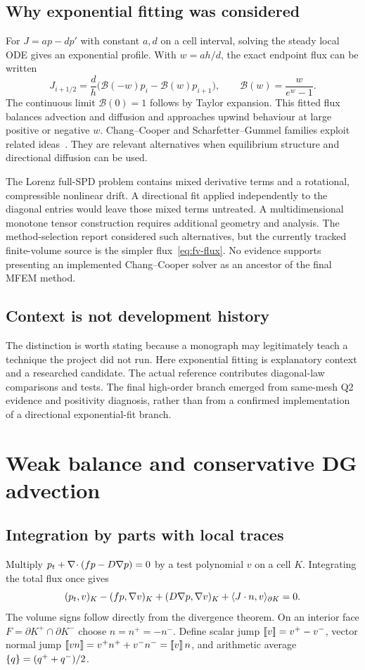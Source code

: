 \section{Why exponential fitting was considered}
For $J=ap-dp'$ with constant $a,d$ on a cell interval, solving the steady local ODE gives an exponential profile. With $w=ah/d$, the exact endpoint flux can be written
\begin{equation}\label{eq:sg}
J_{i+1/2}=\frac d h\big(\mathcal B(-w)p_i-\mathcal B(w)p_{i+1}\big),\qquad
\mathcal B(w)=\frac{w}{e^w-1}.
\end{equation}
The continuous limit $\mathcal B(0)=1$ follows by Taylor expansion. This fitted flux balances advection and diffusion and approaches upwind behaviour at large positive or negative $w$. Chang--Cooper and Scharfetter--Gummel families exploit related ideas~\cite{chang}. They are relevant alternatives when equilibrium structure and directional diffusion can be used.

The Lorenz full-SPD problem contains mixed derivative terms and a rotational, compressible nonlinear drift. A directional fit applied independently to the diagonal entries would leave those mixed terms untreated. A multidimensional monotone tensor construction requires additional geometry and analysis. The method-selection report considered such alternatives, but the currently tracked finite-volume source is the simpler flux~\eqref{eq:fv-flux}. No evidence supports presenting an implemented Chang--Cooper solver as an ancestor of the final MFEM method.

\section{Context is not development history}
The distinction is worth stating because a monograph may legitimately teach a technique the project did not run. Here exponential fitting is explanatory context and a researched candidate. The actual reference contributes diagonal-law comparisons and tests. The final high-order branch emerged from same-mesh Q2 evidence and positivity diagnosis, rather than from a confirmed implementation of a directional exponential-fit branch.

\chapter{Weak balance and conservative DG advection}\label{ch:weak}
\section{Integration by parts with local traces}
Multiply $p_t+\nabla\!\cdot(fp-D\nabla p)=0$ by a test polynomial $v$ on a cell $K$. Integrating the total flux once gives
\begin{equation}\label{eq:cell-weak}
(p_t,v)_K-(fp,\nabla v)_K+(D\nabla p,\nabla v)_K
+\langle J\cdot n,v\rangle_{\partial K}=0.
\end{equation}
The volume signs follow directly from the divergence theorem. On an interior face $F=\partial K^+\cap\partial K^-$ choose $n=n^+=-n^-$. Define scalar jump $[\![v]\!]=v^+-v^-$, vector normal jump $[\![vn]\!]=v^+n^++v^-n^-=[\![v]\!]\,n$, and arithmetic average $\{q\}=(q^++q^-)/2$.

